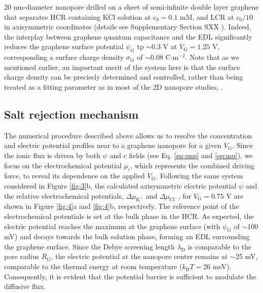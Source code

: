 \documentclass[manuscript=letter, email=true, hyperref=true, keywords=false]{achemso}
\begin{document}
20 nm-diameter nanopore drilled on a sheet of semi-infinite double
layer graphene that separates HCR containing KCl solution at
$c_{0}=0.1$ mM, and LCR at $c_{0}/10$ in axisymmetric coordinates
(details see Supplementary Section SXX ). Indeed, the
interplay between graphene quantum capacitance and the EDL
significantly reduces the graphene surface potential
$\psi_{\mathrm{G}}$ tp $\sim{}$0.3 V at $V_{\mathrm{G}}=1.25$ V,
corresponding a surface charge density $\sigma_{\mathrm{G}}$ of
$\sim{}$0.08 C$\cdot$m$^{-2}$. Note that as we mentioned earlier, an
important merit of the system here is that the surface charge density
can be precisely determined and controlled, rather than being treated
as a fitting parameter as in most of the 2D nanopore studies,
.

\subsection{Salt rejection mechanism}
\label{sec:mechanism}
The numerical procedure described above allows us to resolve the
concentration and electric potential profiles near to a graphene
nanopore for a given $V_{\mathrm{G}}$. Since the ionic flux is driven
by both $\psi$ and $c$ fields (see Eq. \ref{eq:pnp} and \ref{eq:mu}),
we focus on the electrochemical potential $\mu_{i}$, which represents
the combined driving force, to reveal its dependence on the applied
$V_{\mathrm{G}}$. Following the same system considered in Figure
\ref{fig:3}b, the calculated axisymmetric electric potential $\psi$
and the relative electrochemical potentials,
$\Delta \mu_{\mathrm{K^{+}}}$ and $\Delta \mu_{\mathrm{Cl^{-}}}$, for
$V_{\mathrm{G}}=0.75$ V are shown in Figure \ref{fig:4}a and
\ref{fig:4}b, respectively.  The reference point of the electrochemical
potentials is set at the bulk phase in the HCR. As expected, the
electric potential reaches the maximum at the graphene surface (with
$\psi_{\mathrm{G}}$ of $\sim{}$100 mV) and decays towards the bulk
solution phase, forming an EDL surrounding the graphene surface. Since
the Debye screening length $\lambda_{\mathrm{D}}$ is comparable to the
pore radius $R_{\mathrm{G}}$, the electric potential at the nanopore
center remains at $\sim{}$25 mV, comparable to the thermal energy at
room temperature ($k_{\mathrm{B}}T=$26 meV). Consequently, it is
evident that the potential barrier is sufficient to modulate the
diffusive flux.
\end{document}
